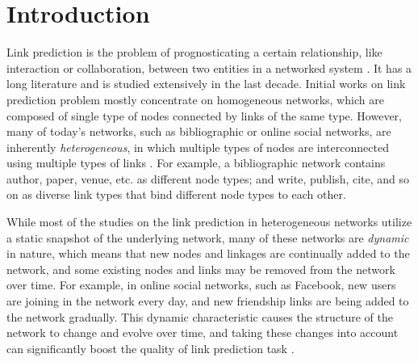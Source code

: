 \section{Introduction}\label{sec:intro}
Link prediction is the problem of prognosticating a certain relationship, like interaction or collaboration, between two entities in a networked system \cite{liben2007link}. It has a long literature and is studied extensively in the last decade. Initial works on link prediction problem mostly concentrate on homogeneous networks, which are composed of single type of nodes connected by links of the same type. However, many of today's networks, such as bibliographic or online social networks, are inherently \emph{heterogeneous}, in which multiple types of nodes are interconnected using multiple types of links \cite{shi2017survey}. For example, a bibliographic network contains author, paper, venue, etc. as different node types; and write, publish, cite, and so on as diverse link types that bind different node types to each other. 

While most of the studies on the link prediction in heterogeneous networks utilize a static snapshot of the underlying network, many of these networks are \emph{dynamic} in nature, which means that new nodes and linkages are continually added to the network, and some existing nodes and links may be removed from the network over time. For example, in online social networks, such as Facebook, new users are joining in the network every day, and new friendship links are being added to the network gradually. This dynamic characteristic causes the structure of the network to change and evolve over time, and taking these changes into account can significantly boost the quality of link prediction task \cite{potgieter2009temporality}.

